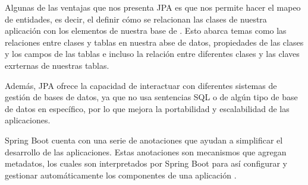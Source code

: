 Algunas de las ventajas que nos presenta JPA es que nos permite hacer el mapeo de entidades, es decir, el definir cómo se relacionan las clases de nuestra aplicación con los elementos de nuestra base de \cite{CitaAJ03}. Esto abarca temas como las relaciones entre clases y tablas en nuestra abse de datos, propiedades de las clases y los campos de las tablas e incluso la relación entre diferentes clases y las claves exrternas de nuestras tablas. 

Además, JPA ofrece la capacidad de interactuar con diferentes sistemas de gestión de bases de datos, ya que no usa sentencias SQL o de algún tipo de base de datos en específico, por lo que mejora la portabilidad y escalabilidad de las aplicaciones. \cite{CitaAJ04}

Spring Boot cuenta con una serie de anotaciones que ayudan a simplificar el desarrollo de las aplicaciones. Estas anotaciones son mecanismos que agregan metadatos, los cuales son interpretados por Spring Boot para así configurar y gestionar automáticamente los componentes de una aplicación \cite{}.

